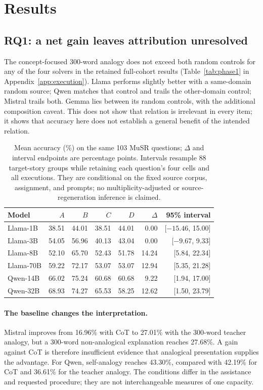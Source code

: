 \section{Results}
\label{sec:results}
\subsection{RQ1: a net gain leaves attribution unresolved}
\label{sec:phase1results}
The concept-focused 300-word analogy does not exceed both random controls for any of the four solvers in the retained full-cohort results (Table~\ref{tab:phase1} in Appendix~\ref{app:execution}). Llama performs slightly better with a same-domain random source; Qwen matches that control and trails the other-domain control; Mistral trails both. Gemma lies between its random controls, with the additional composition caveat. This does not show that relation is irrelevant in every item; it shows that accuracy here does not establish a general benefit of the intended relation.

\begin{table}[t]
\centering\small
\begin{tabular}{@{}lrrrrrr@{}}
\toprule
Model & $A$ & $B$ & $C$ & $D$ & $\Delta$ & 95\% interval \\
\midrule
Llama-1B & 38.51 & 44.01 & 38.51 & 44.01 & 0.00 & [$-15.46$, 15.00] \\
Llama-3B & 54.05 & 56.96 & 40.13 & 43.04 & 0.00 & [$-9.67$, 9.33] \\
Llama-8B & 52.10 & 65.70 & 52.43 & 51.78 & 14.24 & [5.84, 22.34] \\
Llama-70B & 59.22 & 72.17 & 53.07 & 53.07 & 12.94 & [5.35, 21.28] \\
Qwen-14B & 66.02 & 75.24 & 60.68 & 60.68 & 9.22 & [1.94, 17.00] \\
Qwen-32B & 68.93 & 74.27 & 65.53 & 58.25 & 12.62 & [1.50, 23.79] \\
\bottomrule
\end{tabular}
\caption{Mean accuracy (\%) on the same 103 MuSR questions; $\Delta$ and interval endpoints are percentage points. Intervals resample 88 target-story groups while retaining each question's four cells and all executions. They are conditional on the fixed source corpus, assignment, and prompts; no multiplicity-adjusted or source-regeneration inference is claimed.}
\label{tab:factorial}
\end{table}

\paragraph{The baseline changes the interpretation.}
Mistral improves from 16.96\% with CoT to 27.01\% with the 300-word teacher analogy, but a 300-word non-analogical explanation reaches 27.68\%. A gain against CoT is therefore insufficient evidence that analogical presentation supplies the advantage. For Qwen, self-analogy reaches 43.30\%, compared with 42.19\% for CoT and 36.61\% for the teacher analogy. The conditions differ in the assistance and requested procedure; they are not interchangeable measures of one capacity.

